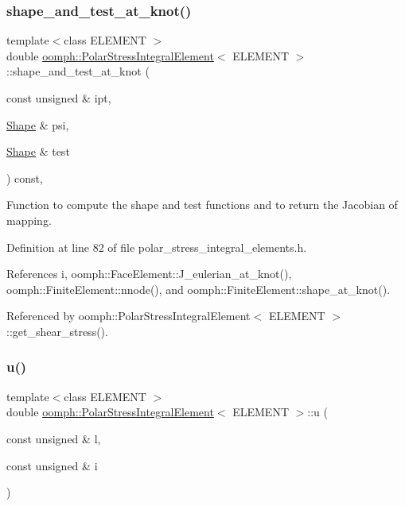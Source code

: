 \subsubsection{\texorpdfstring{shape\+\_\+and\+\_\+test\+\_\+at\+\_\+knot()}{shape\_and\_test\_at\_knot()}}
{\footnotesize\ttfamily template$<$class E\+L\+E\+M\+E\+NT $>$ \\
double \hyperlink{classoomph_1_1PolarStressIntegralElement}{oomph\+::\+Polar\+Stress\+Integral\+Element}$<$ E\+L\+E\+M\+E\+NT $>$\+::shape\+\_\+and\+\_\+test\+\_\+at\+\_\+knot (\begin{DoxyParamCaption}\item[{const unsigned \&}]{ipt,  }\item[{\hyperlink{classoomph_1_1Shape}{Shape} \&}]{psi,  }\item[{\hyperlink{classoomph_1_1Shape}{Shape} \&}]{test }\end{DoxyParamCaption}) const\hspace{0.3cm}{\ttfamily [inline]}, {\ttfamily [protected]}}



Function to compute the shape and test functions and to return the Jacobian of mapping. 



Definition at line 82 of file polar\+\_\+stress\+\_\+integral\+\_\+elements.\+h.



References i, oomph\+::\+Face\+Element\+::\+J\+\_\+eulerian\+\_\+at\+\_\+knot(), oomph\+::\+Finite\+Element\+::nnode(), and oomph\+::\+Finite\+Element\+::shape\+\_\+at\+\_\+knot().



Referenced by oomph\+::\+Polar\+Stress\+Integral\+Element$<$ E\+L\+E\+M\+E\+N\+T $>$\+::get\+\_\+shear\+\_\+stress().

\mbox{\label{classoomph_1_1PolarStressIntegralElement_a2440239bc1944834403dc8a898c71672}} 
\subsubsection{\texorpdfstring{u()}{u()}}
{\footnotesize\ttfamily template$<$class E\+L\+E\+M\+E\+NT $>$ \\
double \hyperlink{classoomph_1_1PolarStressIntegralElement}{oomph\+::\+Polar\+Stress\+Integral\+Element}$<$ E\+L\+E\+M\+E\+NT $>$\+::u (\begin{DoxyParamCaption}\item[{const unsigned \&}]{l,  }\item[{const unsigned \&}]{i }\end{DoxyParamCaption})\hspace{0.3cm}{\ttfamily [inline]}}



